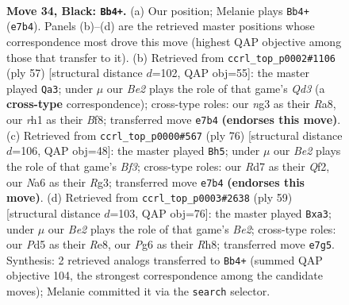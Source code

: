 \documentclass[11pt]{article}
\begin{document}
\clearpage

\begin{figure}[p]\centering
\begin{subfigure}{0.46\textwidth}\centering
\resizebox{\linewidth}{!}{%
\newchessgame
\chessboard[
  setfen={7r/pb1rbk1p/n1q3pP/1p1p1pP1/3P1P2/1P2P1N1/8/R2QKBNR b KQ - 15 34},
  showmover=false,
  pgfstyle=straightmove, color=movearrow, markmove={e7-b4}
]}
\caption{}
\end{subfigure}\hfill
\begin{subfigure}{0.46\textwidth}\centering
\resizebox{\linewidth}{!}{%
\newchessgame
\chessboard[
  setfen={r4bk1/1prn1p2/2pq2p1/P2p3p/3P4/4PNPP/2R2P2/1R2QBK1 b - - 2 29},
  showmover=false,
  pgfstyle=straightmove, color=movearrow, markmove={d6-a3}
]}
\caption{}
\end{subfigure}
\\[4pt]
\begin{subfigure}{0.46\textwidth}\centering
\resizebox{\linewidth}{!}{%
\newchessgame
\chessboard[
  setfen={r4q1k/1r3pbn/4p2p/3pPp2/1PpB3P/p1P2BR1/P4QP1/K5R1 w - - 4 39},
  showmover=false,
  pgfstyle=straightmove, color=movearrow, markmove={f3-h5}
]}
\caption{}
\end{subfigure}\hfill
\begin{subfigure}{0.46\textwidth}\centering
\resizebox{\linewidth}{!}{%
\newchessgame
\chessboard[
  setfen={4r2r/1kpqb3/1pn2p1p/3p1P1P/p1b3P1/P1N1BN2/1PPQ2R1/1K1R4 b - - 6 30},
  showmover=false,
  pgfstyle=straightmove, color=movearrow, markmove={e7-a3}
]}
\caption{}
\end{subfigure}
\caption{\textbf{Move 34, Black: \texttt{Bb4+}.} (a) Our position; Melanie plays \texttt{Bb4+} (\texttt{e7b4}). Panels (b)--(d) are the retrieved master positions whose correspondence most drove this move (highest QAP objective among those that transfer to it). (b) Retrieved from \texttt{ccrl\_top\_p0002\#1106} (ply 57) [structural distance $d$=102, QAP obj=55]: the master played \texttt{Qa3}; under $\mu$ our \emph{Be2} plays the role of that game's \emph{Qd3} (a \textbf{cross-type} correspondence); cross-type roles: our \emph{n}g3 as their \emph{R}a8, our \emph{r}h1 as their \emph{B}f8; transferred move \texttt{e7b4} \textbf{(endorses this move)}. (c) Retrieved from \texttt{ccrl\_top\_p0000\#567} (ply 76) [structural distance $d$=106, QAP obj=48]: the master played \texttt{Bh5}; under $\mu$ our \emph{Be2} plays the role of that game's \emph{Bf3}; cross-type roles: our \emph{R}d7 as their \emph{Q}f2, our \emph{N}a6 as their \emph{R}g3; transferred move \texttt{e7b4} \textbf{(endorses this move)}. (d) Retrieved from \texttt{ccrl\_top\_p0003\#2638} (ply 59) [structural distance $d$=103, QAP obj=76]: the master played \texttt{Bxa3}; under $\mu$ our \emph{Be2} plays the role of that game's \emph{Be2}; cross-type roles: our \emph{P}d5 as their \emph{R}e8, our \emph{P}g6 as their \emph{R}h8; transferred move \texttt{e7g5}. Synthesis: 2 retrieved analogs transferred to \texttt{Bb4+} (summed QAP objective 104, the strongest correspondence among the candidate moves); Melanie committed it via the \texttt{search} selector.}
\label{fig:thought-m67}
\end{figure}
\end{document}
